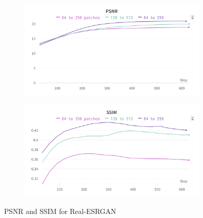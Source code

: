 \begin{figure}[H]
  \centering
  \begin{subfigure}{.5\textwidth}
    \centering
    \includegraphics[width=1\linewidth]{figures/RealESRGAN_psnr.png}
    \label{fig:realesrgan_psnr}
  \end{subfigure}%
  \begin{subfigure}{.5\textwidth}
    \centering
    \includegraphics[width=1\linewidth]{figures/RealESRGAN_ssim.png}
    \label{fig:realesrgan_ssim}
  \end{subfigure}
  \caption{PSNR and SSIM for Real-ESRGAN}
  \label{fig:realesrgan_metrics}
\end{figure}

